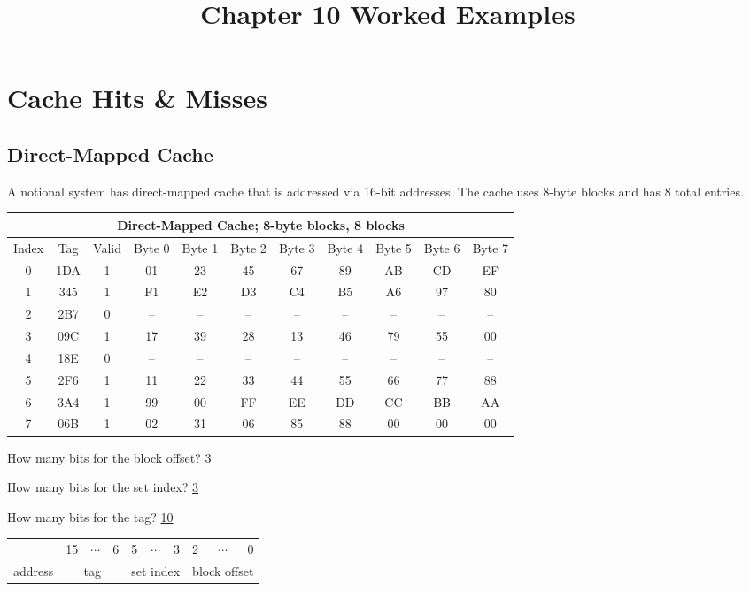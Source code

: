 \documentclass{article}
\begin{document}
\title{Chapter 10 Worked Examples}
\author{}
\date{}
\maketitle

\section{Cache Hits \& Misses}

\subsection{Direct-Mapped Cache}

A notional system has direct-mapped cache that is addressed via 16-bit addresses. The cache uses 8-byte blocks and has 8 total entries.

\begin{tabular}{||c|c|c||c|c|c|c|c|c|c|c||} \hline\hline
\multicolumn{11}{||c||}{Direct-Mapped Cache; 8-byte blocks, 8 blocks} \\ \hline
Index & Tag & Valid & Byte 0 & Byte 1 & Byte 2 & Byte 3 & Byte 4 & Byte 5 & Byte 6 & Byte 7 \\ \hline\hline
0 & 1DA & 1 & 01 & 23 & 45 & 67 & 89 & AB & CD & EF \\ \hline
1 & 345 & 1 & F1 & E2 & D3 & C4 & B5 & A6 & 97 & 80 \\ \hline
2 & 2B7 & 0 & -- & -- & -- & -- & -- & -- & -- & -- \\ \hline
3 & 09C & 1 & 17 & 39 & 28 & 13 & 46 & 79 & 55 & 00 \\ \hline
4 & 18E & 0 & -- & -- & -- & -- & -- & -- & -- & -- \\ \hline
5 & 2F6 & 1 & 11 & 22 & 33 & 44 & 55 & 66 & 77 & 88 \\ \hline
6 & 3A4 & 1 & 99 & 00 & FF & EE & DD & CC & BB & AA \\ \hline
7 & 06B & 1 & 02 & 31 & 06 & 85 & 88 & 00 & 00 & 00 \\ \hline\hline
\end{tabular}

How many bits for the block offset? \underline{3}

How many bits for the set index? \underline{3}

How  many bits for the tag? \underline{10}

\phantom{x}

\begin{tabular}{llcrlcrlcr}
& 15 & $\cdots$ & 6 & 5 & $\cdots$ & 3 & 2 & $\cdots$ & 0 \\ \cline{2-10}
address & \multicolumn{3}{|c|}{tag} & \multicolumn{3}{|c|}{set index} & \multicolumn{3}{|c|}{block offset} \\ \cline{2-10}
\end{tabular}
\end{document}
